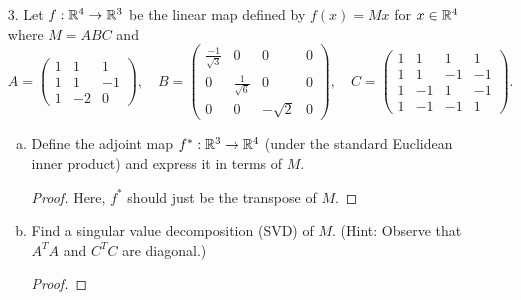 \begin{itemize}
\begin{enumerate}[(a)]
\item Show that $X = R_{T^{n}} \oplus N_{T^{n}}$.
\begin{proof}

\end{proof}


\item Show that there exists a linear map $S : X \rar X$ such that $ST = TS$ and $ST^{n+1} = T^n$:

\begin{proof}

\end{proof}
\end{enumerate}








\item[3.] Let $f : \mathbb{R}^4 \rightarrow \mathbb{R}^3$ be the linear map defined by $f(x) = M x$ for $x \in \mathbb{R}^4$ where
$M = ABC$ and
$$A = \begin{pmatrix}
    1 & 1 & 1 \\
    1 & 1 & -1 \\
    1 & -2 & 0
\end{pmatrix}, \quad 
B = \begin{pmatrix}
    \frac{-1}{\sqrt{3}} & 0 & 0 & 0 \\
    0 & \frac{1}{\sqrt{6}} & 0 & 0 \\
    0 & 0 &-\sqrt{2} & 0 
\end{pmatrix}, \quad 
C = \begin{pmatrix}
    1 & 1 & 1 & 1 \\
    1 & 1 & -1 & -1 \\
    1 & -1 & 1 & -1 \\
    1 & -1 & -1 & 1
\end{pmatrix}.$$

\begin{enumerate}[(a)]
\item Define the adjoint map $f^* : \mathbb{R}^3 \rightarrow \mathbb{R}^4$ (under the standard Euclidean
inner product) and express it in terms of $M$.
\begin{proof}
    Here, $f^*$ should just be the transpose of $M$.
\end{proof}


\item Find a singular value decomposition (SVD) of $M$. (Hint: Observe that
$A^T A$ and $C^T C$ are diagonal.)
\begin{proof}


\end{proof}
\end{enumerate}
\end{itemize}
